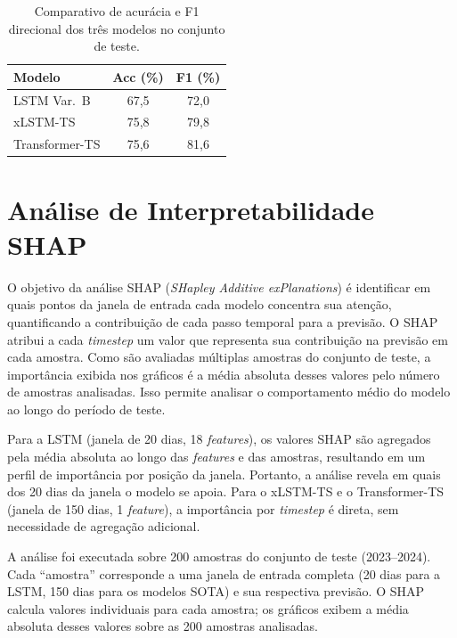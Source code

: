 \begin{table}[H]
\centering
\caption{Comparativo de acurácia e F1 direcional dos três modelos no conjunto de teste.}
\label{tab:comparativo}
\begin{tabular}{@{}lcc@{}}
\toprule
\textbf{Modelo} & \textbf{Acc (\%)} & \textbf{F1 (\%)} \\
\midrule
LSTM Var.~B    & 67,5 & 72,0 \\
xLSTM-TS       & 75,8 & 79,8 \\
Transformer-TS & 75,6 & 81,6 \\
\bottomrule
\end{tabular}
\end{table}


\section{Análise de Interpretabilidade SHAP}
\label{sec:res_shap}

O objetivo da análise SHAP (\textit{SHapley Additive exPlanations}) é identificar em quais pontos da janela de entrada cada modelo concentra sua atenção, quantificando a contribuição de cada passo temporal para a previsão. O SHAP atribui a cada \textit{timestep} um valor que representa sua contribuição na previsão em cada amostra. Como são avaliadas múltiplas amostras do conjunto de teste, a importância exibida nos gráficos é a média absoluta desses valores pelo número de amostras analisadas. Isso permite analisar o comportamento médio do modelo ao longo do período de teste.

Para a LSTM (janela de 20 dias, 18 \textit{features}), os valores SHAP são agregados pela média absoluta ao longo das \textit{features} e das amostras, resultando em um perfil de importância por posição da janela. Portanto, a análise revela em quais dos 20 dias da janela o modelo se apoia. Para o xLSTM-TS e o Transformer-TS (janela de 150 dias, 1 \textit{feature}), a importância por \textit{timestep} é direta, sem necessidade de agregação adicional.

A análise foi executada sobre 200 amostras do conjunto de teste (2023--2024). Cada ``amostra'' corresponde a uma janela de entrada completa (20 dias para a LSTM, 150 dias para os modelos SOTA) e sua respectiva previsão. O SHAP calcula valores individuais para cada amostra; os gráficos exibem a média absoluta desses valores sobre as 200 amostras analisadas.

